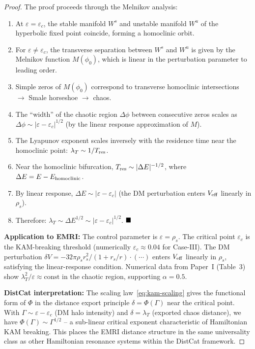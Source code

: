 \documentclass[
]{article}
\begin{document}
\begin{proof}
The proof proceeds through the Melnikov analysis:
\begin{enumerate}
\item At $\varepsilon = \varepsilon_c$, the stable manifold $W^s$ and unstable manifold $W^u$ of the hyperbolic fixed point coincide, forming a homoclinic orbit.
\item For $\varepsilon \neq \varepsilon_c$, the transverse separation between $W^s$ and $W^u$ is given by the Melnikov function $M(\phi_0)$, which is linear in the perturbation parameter to leading order.
\item Simple zeros of $M(\phi_0)$ correspond to transverse homoclinic intersections $\to$ Smale horseshoe $\to$ chaos.
\item The ``width'' of the chaotic region $\Delta\phi$ between consecutive zeros scales as $\Delta\phi \sim |\varepsilon - \varepsilon_c|^{1/2}$ (by the linear response approximation of $M$).
\item The Lyapunov exponent scales inversely with the residence time near the homoclinic point: $\lambda_T \sim 1/T_{\rm res}$.
\item Near the homoclinic bifurcation, $T_{\rm res} \sim |\Delta E|^{-1/2}$, where $\Delta E = E - E_{\rm homoclinic}$.
\item By linear response, $\Delta E \sim |\varepsilon - \varepsilon_c|$ (the DM perturbation enters $V_{\rm eff}$ linearly in $\rho_s$).
\item Therefore: $\lambda_T \sim \Delta E^{1/2} \sim |\varepsilon - \varepsilon_c|^{1/2}$. $\hfill\blacksquare$
\end{enumerate}

\textbf{Application to EMRI:} The control parameter is $\varepsilon = \rho_s$. The critical point $\varepsilon_c$ is the KAM-breaking threshold (numerically $\varepsilon_c \approx 0.04$ for Case-III). The DM perturbation $\delta V = -32\pi\rho_s r_s^2/(1+r_s/r) \cdot (\cdots)$ enters $V_{\rm eff}$ linearly in $\rho_s$, satisfying the linear-response condition. Numerical data from Paper~I (Table~3) show $\lambda_T^2/\varepsilon \approx \text{const}$ in the chaotic region, supporting $\alpha = 0.5$.

\textbf{DistCat interpretation:} The scaling law~\eqref{eq:kam-scaling} gives the functional form of $\Phi$ in the distance export principle $\delta = \Phi(\Gamma)$ near the critical point. With $\Gamma \sim \varepsilon - \varepsilon_c$ (DM halo intensity) and $\delta = \lambda_T$ (exported chaos distance), we have $\Phi(\Gamma) \sim \Gamma^{1/2}$ -- a sub-linear critical exponent characteristic of Hamiltonian KAM breaking. This places the EMRI distance structure in the same universality class as other Hamiltonian resonance systems within the DistCat framework.
\end{proof}
\end{document}
